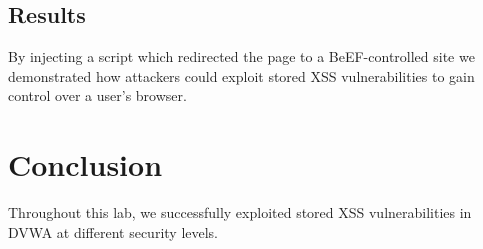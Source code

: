 \documentclass[12pt]{article}
\begin{document}
\subsection{Results}

By injecting a script which redirected the page to a BeEF-controlled site we demonstrated how attackers could exploit stored XSS vulnerabilities to gain control over a user's browser. 

\section{Conclusion}

Throughout this lab, we successfully exploited stored XSS vulnerabilities in DVWA at different security levels. 
\end{document}
